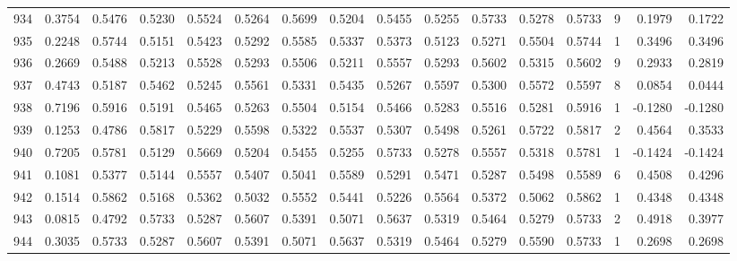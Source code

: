 \begin{tabular}{lrrrrrrrrrrrrrrr}
934 &      0.3754 &  0.5476 &  0.5230 &  0.5524 &  0.5264 &  0.5699 &  0.5204 &  0.5455 &  0.5255 &  0.5733 &   0.5278 &     0.5733 &      9 &                    0.1979 &                     0.1722 \\
935 &      0.2248 &  0.5744 &  0.5151 &  0.5423 &  0.5292 &  0.5585 &  0.5337 &  0.5373 &  0.5123 &  0.5271 &   0.5504 &     0.5744 &      1 &                    0.3496 &                     0.3496 \\
936 &      0.2669 &  0.5488 &  0.5213 &  0.5528 &  0.5293 &  0.5506 &  0.5211 &  0.5557 &  0.5293 &  0.5602 &   0.5315 &     0.5602 &      9 &                    0.2933 &                     0.2819 \\
937 &      0.4743 &  0.5187 &  0.5462 &  0.5245 &  0.5561 &  0.5331 &  0.5435 &  0.5267 &  0.5597 &  0.5300 &   0.5572 &     0.5597 &      8 &                    0.0854 &                     0.0444 \\
938 &      0.7196 &  0.5916 &  0.5191 &  0.5465 &  0.5263 &  0.5504 &  0.5154 &  0.5466 &  0.5283 &  0.5516 &   0.5281 &     0.5916 &      1 &                   -0.1280 &                    -0.1280 \\
939 &      0.1253 &  0.4786 &  0.5817 &  0.5229 &  0.5598 &  0.5322 &  0.5537 &  0.5307 &  0.5498 &  0.5261 &   0.5722 &     0.5817 &      2 &                    0.4564 &                     0.3533 \\
940 &      0.7205 &  0.5781 &  0.5129 &  0.5669 &  0.5204 &  0.5455 &  0.5255 &  0.5733 &  0.5278 &  0.5557 &   0.5318 &     0.5781 &      1 &                   -0.1424 &                    -0.1424 \\
941 &      0.1081 &  0.5377 &  0.5144 &  0.5557 &  0.5407 &  0.5041 &  0.5589 &  0.5291 &  0.5471 &  0.5287 &   0.5498 &     0.5589 &      6 &                    0.4508 &                     0.4296 \\
942 &      0.1514 &  0.5862 &  0.5168 &  0.5362 &  0.5032 &  0.5552 &  0.5441 &  0.5226 &  0.5564 &  0.5372 &   0.5062 &     0.5862 &      1 &                    0.4348 &                     0.4348 \\
943 &      0.0815 &  0.4792 &  0.5733 &  0.5287 &  0.5607 &  0.5391 &  0.5071 &  0.5637 &  0.5319 &  0.5464 &   0.5279 &     0.5733 &      2 &                    0.4918 &                     0.3977 \\
944 &      0.3035 &  0.5733 &  0.5287 &  0.5607 &  0.5391 &  0.5071 &  0.5637 &  0.5319 &  0.5464 &  0.5279 &   0.5590 &     0.5733 &      1 &                    0.2698 &                     0.2698 \\

\end{tabular}
